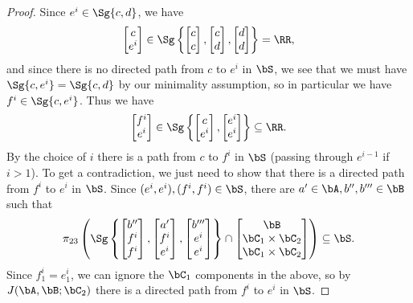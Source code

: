 \begin{proof}
Since $e^i \in \Sg\{c,d\}$, we have
\[
\begin{bmatrix}c\\ e^i\end{bmatrix} \in \Sg\left\{\begin{bmatrix}c\\ c\end{bmatrix},\begin{bmatrix}c\\ d\end{bmatrix},\begin{bmatrix}d\\ d\end{bmatrix}\right\} = \RR,
\]
and since there is no directed path from $c$ to $e^i$ in $\bS$, we see that we must have $\Sg\{c,e^i\} = \Sg\{c,d\}$ by our minimality assumption, so in particular we have $f^i \in \Sg\{c,e^i\}$. Thus we have
\[
\begin{bmatrix}f^i\\ e^i\end{bmatrix} \in \Sg\left\{\begin{bmatrix}c\\ e^i\end{bmatrix},\begin{bmatrix}e^i\\ e^i\end{bmatrix}\right\} \subseteq \RR.
\]
By the choice of $i$ there is a path from $c$ to $f^i$ in $\bS$ (passing through $e^{i-1}$ if $i > 1$). To get a contradiction, we just need to show that there is a directed path from $f^i$ to $e^i$ in $\bS$. Since $(e^i,e^i), (f^i,f^i) \in \bS$, there are $a' \in \bA, b'',b''' \in \bB$ such that
\[
\pi_{23}\left(\Sg\left\{\begin{bmatrix}b''\\ f^i\\ f^i\end{bmatrix}, \begin{bmatrix} a'\\ f^i\\ e^i\end{bmatrix}, \begin{bmatrix}b'''\\ e^i\\ e^i\end{bmatrix}\right\}\cap \begin{bmatrix}\bB\\ \bC_1\times\bC_2\\ \bC_1\times\bC_2\end{bmatrix}\right) \subseteq \bS.
\]
Since $f^i_1 = e^i_1$, we can ignore the $\bC_1$ components in the above, so by $J(\bA,\bB;\bC_2)$ there is a directed path from $f^i$ to $e^i$ in $\bS$.
\end{proof}

